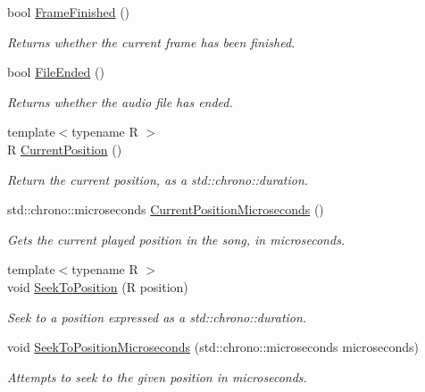 \begin{DoxyCompactItemize}
bool \hyperlink{classAudio_afab4e39f1e74e9a20ab456da2944a3aa}{Frame\+Finished} ()
\begin{DoxyCompactList}\small\item\em Returns whether the current frame has been finished. \end{DoxyCompactList}\item 
bool \hyperlink{classAudio_a55e15a8f6e55f018a60fb477959801e5}{File\+Ended} ()
\begin{DoxyCompactList}\small\item\em Returns whether the audio file has ended. \end{DoxyCompactList}\item 
{\footnotesize template$<$typename R $>$ }\\R \hyperlink{classAudio_a5cdd89a7f22612f23e3a6fb36c7f451f}{Current\+Position} ()
\begin{DoxyCompactList}\small\item\em Return the current position, as a std\+::chrono\+::duration. \end{DoxyCompactList}\item 
std\+::chrono\+::microseconds \hyperlink{classAudio_a992b812a2b1f8456f92ca61ec97e4f80}{Current\+Position\+Microseconds} ()
\begin{DoxyCompactList}\small\item\em Gets the current played position in the song, in microseconds. \end{DoxyCompactList}\item 
{\footnotesize template$<$typename R $>$ }\\void \hyperlink{classAudio_a5b27592a425fb3e1732c04f9654dd644}{Seek\+To\+Position} (R position)
\begin{DoxyCompactList}\small\item\em Seek to a position expressed as a std\+::chrono\+::duration. \end{DoxyCompactList}\item 
void \hyperlink{classAudio_a3f9b62150a4acb519f47d6d633a33353}{Seek\+To\+Position\+Microseconds} (std\+::chrono\+::microseconds microseconds)
\begin{DoxyCompactList}\small\item\em Attempts to seek to the given position in microseconds. \end{DoxyCompactList}\end{DoxyCompactItemize}
